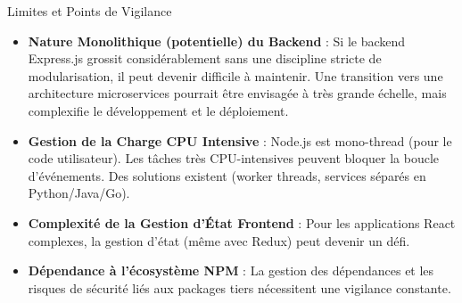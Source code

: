 \documentclass[11pt,a4paper]{report}
\begin{document}
\begin{infobox}{Limites et Points de Vigilance}
\begin{itemize}
    \item \textbf{Nature Monolithique (potentielle) du Backend} : Si le backend Express.js grossit considérablement sans une discipline stricte de modularisation, il peut devenir difficile à maintenir. Une transition vers une architecture microservices pourrait être envisagée à très grande échelle, mais complexifie le développement et le déploiement.
    \item \textbf{Gestion de la Charge CPU Intensive} : Node.js est mono-thread (pour le code utilisateur). Les tâches très CPU-intensives peuvent bloquer la boucle d'événements. Des solutions existent (worker threads, services séparés en Python/Java/Go).
    \item \textbf{Complexité de la Gestion d'État Frontend} : Pour les applications React complexes, la gestion d'état (même avec Redux) peut devenir un défi.
    \item \textbf{Dépendance à l'écosystème NPM} : La gestion des dépendances et les risques de sécurité liés aux packages tiers nécessitent une vigilance constante.
\end{itemize}
\end{infobox}
\end{document}
